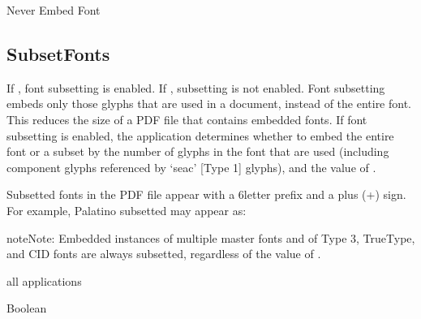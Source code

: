 \documentclass[letterpaper,12pt,english,openany,oneside]{sphinxmanual}
\begin{document}
Never Embed Font

\label{\detokenize{PDF_Create_CommonSettings:default-value-68}}

\begin{sphinxVerbatim}[commandchars=\\\{\}]
\PYG{p}{[}\PYG{p}{]}
\end{sphinxVerbatim}




\subsection{SubsetFonts}
\label{\detokenize{PDF_Create_CommonSettings:subsetfonts}}
If  , font subsetting is enabled. If  , subsetting is not enabled. Font subsetting embeds only those glyphs that are used in a document, instead of the entire font. This reduces the size of a PDF file that contains embedded fonts. If font subsetting is enabled, the application determines whether to embed the entire font or a subset by the number of glyphs in the font that are used (including component glyphs referenced by ‘seac’ {[}Type 1{]} glyphs), and the value of  .

Subsetted fonts in the PDF file appear with a 6\sphinxhyphen{}letter prefix and a plus (+) sign. For example, Palatino subsetted may appear as:

\begin{sphinxVerbatim}[commandchars=\\\{\}]
\end{sphinxVerbatim}

\begin{sphinxadmonition}{note}{Note:}
Embedded instances of multiple master fonts and of Type 3, TrueType, and CID fonts are always subsetted, regardless of the value of  .
\end{sphinxadmonition}
\label{\detokenize{PDF_Create_CommonSettings:supported-by-73}}

all applications

\label{\detokenize{PDF_Create_CommonSettings:type-72}}

Boolean

\label{\detokenize{PDF_Create_CommonSettings:ui-name-59}}
\end{document}

